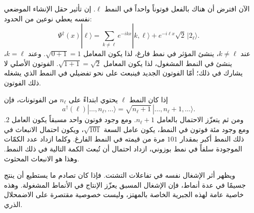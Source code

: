 الآن افترض أن هناك بالفعل فوتوناً واحداً في النمط \(\ell\). إن تأثير حقل الإنشاء الموضعي نفسه يعطي نوعين من الحدود:
\begin{equation}
\Psi^\dagger(x)|\ell\rangle
=
\sum_{k\ne\ell}e^{-ikx}|k,\ell\rangle
+e^{-i\ell x}\sqrt{2}\,|2_\ell\rangle.
\end{equation}
عند \(k\ne\ell\)، ينشئ المؤثر في نمط فارغ، لذا يكون المعامل \(\sqrt{0+1}=1\). وعند \(k=\ell\)، ينشئ في النمط المشغول، لذا يكون المعامل \(\sqrt{1+1}=\sqrt{2}\). الفوتون الأصلي لا يشارك في ذلك؛ أمّا الفوتون الجديد فينبعث على نحو تفضيلي في النمط الذي يشغله ذلك الفوتون.

\begin{classroomqa}
\end{classroomqa}

إذا كان النمط \(\ell\) يحتوي ابتداءً على \(n_\ell\) من الفوتونات، فإن
\begin{equation}
a^\dagger(\ell)
|\ldots,n_\ell,\ldots\rangle
=
\sqrt{n_\ell+1}
\,|\ldots,n_\ell+1,\ldots\rangle.
\end{equation}
ومن ثم يتعزّز الاحتمال بالعامل \(n_\ell+1\). ومع وجود فوتون واحد مسبقاً يكون العامل \(2\). ومع وجود مئة فوتون في النمط، يكون عامل السعة \(\sqrt{101}\)، ويكون احتمال الانبعاث في ذلك النمط أكبر بمقدار \(101\) مرة من قيمته في النمط الفارغ. وكلما ازداد عدد الكمّات الموجودة سلفاً في نمط بوزوني، ازداد احتمال أن تُبعث الكمة التالية في ذلك النمط. وهذا هو الانبعاث المحثوث.

ويظهر أثر الإشغال نفسه في تفاعلات التشتت. فإذا كان تصادم ما يستطيع أن ينتج جسيمًا في عدة أنماط، فإن الإشغال المسبق يعزّز الإنتاج في الأنماط المشغولة. وهذه خاصية عامة لهذه الجبرية الخاصة بالمهتز، وليست خصوصية مقتصرة على الاضمحلال الذري.

\begin{classroomqa}
\end{classroomqa}

